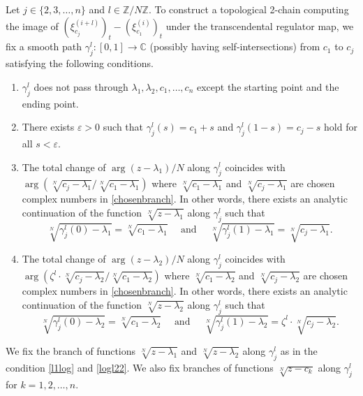 \documentclass[letterpaper, 11pt]{amsart}
\theoremstyle{my theoremstyle}
\theoremstyle{dfn}
\theoremstyle{remark}
\renewcommand{\1}{\mathbbm{1}}
\newcommand{\C}{\mathbb{C}}
\newcommand{\Z}{\mathbb{Z}}
\renewcommand{\l}{\lambda}
\numberwithin{equation}{section}
\begin{document}
Let $j\in \{2,3,\dots,n\}$ and $l\in \Z/N\Z$.
To construct a topological 2-chain computing the image of $(\xi_{c_j}^{(i+l)})_t-(\xi_{c_1}^{(i)})_t$ under the transcendental regulator map, we fix a smooth path $\gamma_j^l\colon[0,1]\to \C$ (possibly having self-intersections) from $c_1$ to $c_j$ satisfying the following conditions.
\begin{enumerate}
\item\label{i} $\gamma_j^l$ does not pass through $\l_1,\l_2,c_1,\dots,c_n$ except the starting point and the ending point.
\item There exists $\varepsilon>0$ such that $\gamma_j^l(s) = c_1+s$ and $\gamma_j^l(1-s) = c_j - s$ hold for all $s<\varepsilon$.
\item\label{l1log} The total change of $\arg(z-\l_1)/N$ along $\gamma_j^l$ coincides with $\arg(\sqrt[N]{c_j-\l_1}/\sqrt[N]{c_1-\l_1})$ where $\sqrt[N]{c_1-\l_1}$ and $\sqrt[N]{c_j-\l_1}$ are chosen complex numbers in \eqref{chosenbranch}.
In other words, there exists an analytic continuation of the function $\sqrt[N]{z-\l_1}$ along $\gamma_j^l$ such that 
\begin{equation*}
\sqrt[N]{\gamma_j^l(0)-\l_1} = \sqrt[N]{c_1-\l_1}\quad \text{ and }\quad \sqrt[N]{\gamma_j^l(1)-\l_1}= \sqrt[N]{c_j-\l_1}.
\end{equation*}
\item\label{logl22} The total change of $\arg(z-\l_2)/N$ along $\gamma_j^l$ coincides with $\arg(\zeta^l\cdot\sqrt[N]{c_j-\l_2}/\sqrt[N]{c_1-\l_2})$ where $\sqrt[N]{c_1-\l_2}$ and $\sqrt[N]{c_j-\l_2}$ are chosen complex numbers in \eqref{chosenbranch}.
In other words, there exists an analytic continuation of the function $\sqrt[N]{z-\l_2}$ along $\gamma_j^l$ such that 
\begin{equation*}
\sqrt[N]{\gamma_j^l(0)-\l_2} = \sqrt[N]{c_1-\l_2}\quad \text{ and }\quad \sqrt[N]{\gamma_j^l(1)-\l_2}= \zeta^l\cdot \sqrt[N]{c_j-\l_2}.
\end{equation*}
\end{enumerate}
We fix the branch of functions $\sqrt[N]{z-\l_1}$ and $\sqrt[N]{z-\l_2}$ along $\gamma_j^l$ as in the condition \ref{l1log} and \ref{logl22}.
We also fix branches of functions $\sqrt[N]{z-c_k}$ along $\gamma_j^l$ for $k=1,2,\dots, n$.
\end{document}
